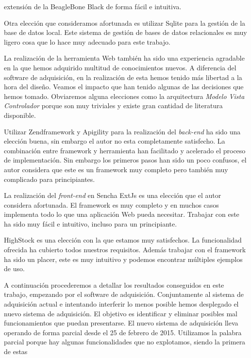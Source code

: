 	extensión de la BeagleBone Black de forma fácil e intuitiva.    
	\par
	Otra elección que consideramos afortunada es utilizar Sqlite\cite{Sqlite} para la gestión de la base de datos local. Este sistema de gestión
	de bases de datos relacionales es muy ligero cosa que lo hace muy adecuado para este trabajo.
	\par
	La realización de la herramienta Web también ha sido una experiencia agradable en la que hemos adquirido multitud de conocimientos nuevos. A
	diferencia del software de adquisición, en la realización de esta hemos tenido más libertad a la hora del diseño. Veamos el impacto que han
	tenido algunas de las decisiones que hemos tomado. Obviaremos alguna elecciones como la arquitectura \emph{Modelo Vista Controlador} porque
	son muy triviales y existe gran cantidad de literatura disponible.
	\par
	Utilizar Zendframework y Apigility para la realización del \emph{back-end} ha sido una elección buena, sin embargo el autor no esta
	completamente satisfecho. La combinación entre framework y herramienta han facilitado y acelerado el proceso de implementación. Sin embargo
	los primeros pasos han sido un poco confusos, el autor considera que este es un framework muy completo pero también muy complicado para
	principiantes.
	\par
	La realización del \emph{front-end} en Sencha ExtJs es una elección que el autor considera afortunada. El framework es muy completo y en
	muchos casos implementa todo lo que una aplicación Web pueda necesitar. Trabajar con este ha sido muy fácil e intuitivo, incluso para un
	principiante. 
	\par
	HighStock es una elección con la que estamos muy satisfechos. La funcionalidad ofrecida ha cubierto todos nuestros requisitos. Además trabajar
	con el framework ha sido un placer, este es muy intuitivo y podemos encontrar múltiples ejemplos de uso.
	\par
	A continuación procederemos a detallar los resultados conseguidos en este trabajo, empezando por el software de adquisición. Conjuntamente al
	sistema de adquisición actual e intentando interferir lo menos posible hemos desplegado el nuevo sistema de adquisición. El objetivo es
	identificar y eliminar posibles mal funcionamientos que puedan presentarse. El nuevo sistema de adquisición lleva operando de forma parcial
	desde el 25 de febrero de 2015. Utilizamos la palabra parcial porque hay algunas funcionalidades que no explotamos, siendo la primera de estas
